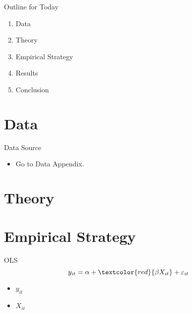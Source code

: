\documentclass[aspectratio=169,11pt]{beamer}
\begin{document}
\begin{frame}{Outline for Today}
  \begin{enumerate}
    \item Data
    \item Theory
    \item Empirical Strategy
    \item Results
    \item Conclusion
  \end{enumerate}
\end{frame}

\section{Data}
\begin{frame}
\sectionpage
\end{frame}

\begin{frame}[label=data]{Data Source}
    \begin{itemize}
        \item Go to Data Appendix. \hyperlink{data_appendix}{}
    \end{itemize}
    
\end{frame}

\section{Theory}
\begin{frame}
\sectionpage
\end{frame}

\section{Empirical Strategy}
\begin{frame}
\sectionpage
\end{frame}

\begin{frame}{OLS}
    \begin{equation}
        y_{it} = \alpha + \textcolor{red}{\beta X_{it}} + \varepsilon_{it}
    \end{equation}
    \begin{itemize}
        \item $y_{it}$
        \item $X_{it}$
    \end{itemize}
\end{frame}
\end{document}
